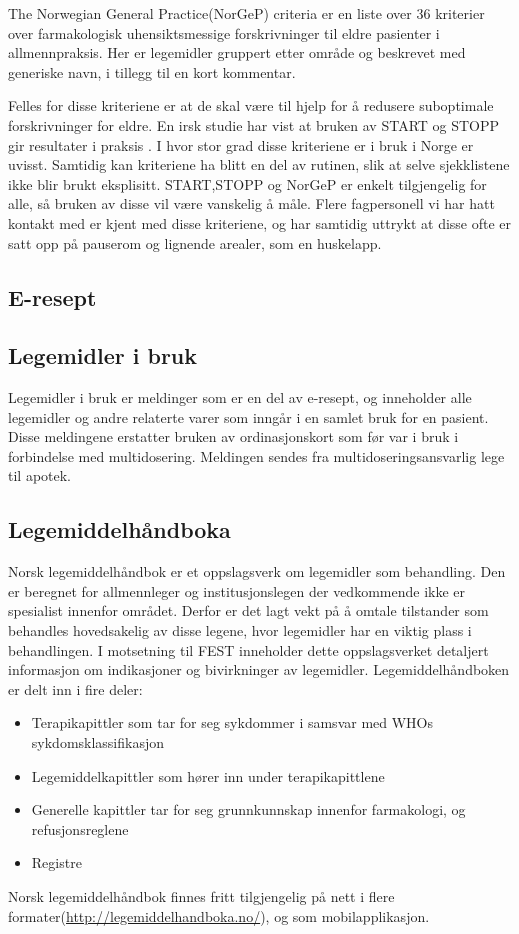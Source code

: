 The Norwegian General Practice(NorGeP) criteria er en liste over 36 kriterier over farmakologisk uhensiktsmessige forskrivninger til eldre pasienter i allmennpraksis. Her er legemidler gruppert etter område og beskrevet med generiske navn, i tillegg til en kort kommentar.

Felles for disse kriteriene er at de skal være til hjelp for å redusere suboptimale forskrivninger for eldre. En irsk studie har vist at bruken av START og STOPP gir resultater i praksis \citep{START_STOPP_GALLAGHER}. I hvor stor grad disse kriteriene er i bruk i Norge er uvisst. Samtidig kan kriteriene ha blitt en del av rutinen, slik at selve sjekklistene ikke blir brukt eksplisitt. START,STOPP og NorGeP er enkelt tilgjengelig for alle, så bruken av disse vil være vanskelig å måle. Flere fagpersonell vi har hatt kontakt med er kjent med disse kriteriene, og har samtidig uttrykt at disse ofte er satt opp på pauserom og lignende arealer, som en huskelapp.  
\subsection{E-resept}
\subsection{Legemidler i bruk}
Legemidler i bruk er meldinger som er en del av e-resept, og inneholder alle legemidler og andre relaterte varer som inngår i en samlet bruk for en pasient. Disse meldingene erstatter bruken av ordinasjonskort som før var i bruk i forbindelse med multidosering. Meldingen sendes fra multidoseringsansvarlig lege til apotek.
\subsection{Legemiddelhåndboka}
Norsk legemiddelhåndbok er et oppslagsverk om legemidler som behandling. Den er beregnet for allmennleger og institusjonslegen der vedkommende ikke er spesialist innenfor området. Derfor er det lagt vekt på å omtale tilstander som behandles hovedsakelig av disse legene, hvor legemidler har en viktig plass i behandlingen. I motsetning til FEST inneholder dette oppslagsverket detaljert informasjon om indikasjoner og bivirkninger av legemidler. Legemiddelhåndboken er delt inn i fire deler: 
\begin{itemize}
  \item Terapikapittler som tar for seg sykdommer i samsvar med WHOs sykdomsklassifikasjon
  \item Legemiddelkapittler som hører inn under terapikapittlene
  \item Generelle kapittler tar for seg grunnkunnskap innenfor farmakologi, og refusjonsreglene
  \item Registre 
\end{itemize}
Norsk legemiddelhåndbok finnes fritt tilgjengelig på nett i flere formater(\url{http://legemiddelhandboka.no/}), og som mobilapplikasjon.
